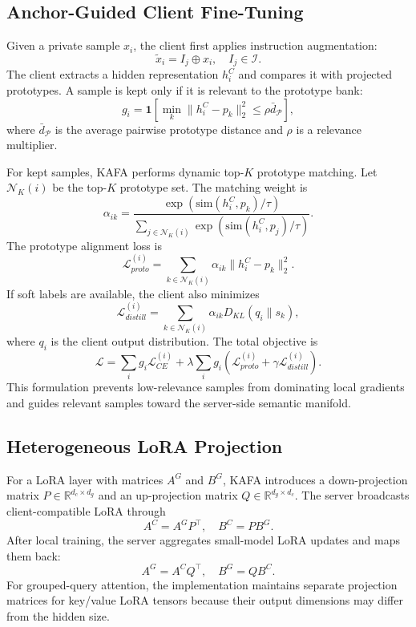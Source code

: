 \documentclass[conference]{IEEEtran}
\begin{document}
\subsection{Anchor-Guided Client Fine-Tuning}
Given a private sample $x_i$, the client first applies instruction augmentation:
\begin{equation}
\tilde{x}_i = I_j \oplus x_i, \quad I_j \in \mathcal{I}.
\end{equation}
The client extracts a hidden representation $h_i^C$ and compares it with projected prototypes. A sample is kept only if it is relevant to the prototype bank:
\begin{equation}
g_i = \mathbf{1}\left[\min_k \|h_i^C-p_k\|_2^2 \le \rho \bar{d}_{\mathcal{P}}\right],
\end{equation}
where $\bar{d}_{\mathcal{P}}$ is the average pairwise prototype distance and $\rho$ is a relevance multiplier.

For kept samples, KAFA performs dynamic top-$K$ prototype matching. Let $\mathcal{N}_K(i)$ be the top-$K$ prototype set. The matching weight is
\begin{equation}
\alpha_{ik}=\frac{\exp(\mathrm{sim}(h_i^C,p_k)/\tau)}{\sum_{j\in\mathcal{N}_K(i)}\exp(\mathrm{sim}(h_i^C,p_j)/\tau)}.
\end{equation}
The prototype alignment loss is
\begin{equation}
\mathcal{L}_{proto}^{(i)}=\sum_{k\in\mathcal{N}_K(i)}\alpha_{ik}\|h_i^C-p_k\|_2^2.
\end{equation}
If soft labels are available, the client also minimizes
\begin{equation}
\mathcal{L}_{distill}^{(i)}=\sum_{k\in\mathcal{N}_K(i)}\alpha_{ik}D_{KL}(q_i\|s_k),
\end{equation}
where $q_i$ is the client output distribution. The total objective is
\begin{equation}
\mathcal{L}=\sum_i g_i\mathcal{L}_{CE}^{(i)} + \lambda\sum_i g_i\left(\mathcal{L}_{proto}^{(i)}+\gamma\mathcal{L}_{distill}^{(i)}\right).
\label{eq:loss}
\end{equation}
This formulation prevents low-relevance samples from dominating local gradients and guides relevant samples toward the server-side semantic manifold.

\subsection{Heterogeneous LoRA Projection}
For a LoRA layer with matrices $A^G$ and $B^G$, KAFA introduces a down-projection matrix $P\in\mathbb{R}^{d_c\times d_g}$ and an up-projection matrix $Q\in\mathbb{R}^{d_g\times d_c}$. The server broadcasts client-compatible LoRA through
\begin{equation}
A^C = A^G P^\top, \quad B^C = P B^G.
\end{equation}
After local training, the server aggregates small-model LoRA updates and maps them back:
\begin{equation}
A^G = A^C Q^\top, \quad B^G = Q B^C.
\end{equation}
For grouped-query attention, the implementation maintains separate projection matrices for key/value LoRA tensors because their output dimensions may differ from the hidden size.
\end{document}

